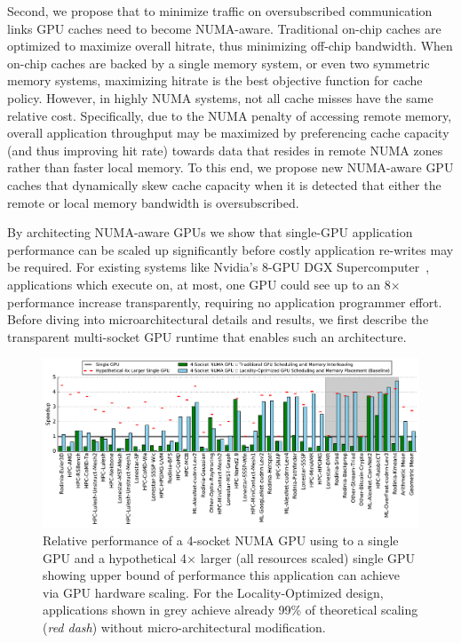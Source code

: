 Second, we propose that to minimize traffic on oversubscribed communication 
links GPU caches need to become NUMA-aware.  Traditional on-chip caches are 
optimized to maximize overall hitrate, thus minimizing off-chip bandwidth.  When 
on-chip caches are backed by a single memory system, or even two symmetric 
memory systems, maximizing hitrate is the best objective function for cache 
policy.  However, in highly NUMA systems,  not all cache misses have the same 
relative cost.  Specifically, due to the NUMA penalty of accessing remote 
memory, overall application throughput may be maximized by preferencing cache 
capacity (and thus improving hit rate) towards data that resides in remote NUMA 
zones rather than faster local memory. To this end, we propose new NUMA-aware 
GPU caches that dynamically skew cache capacity when it is detected that either 
the remote or local memory bandwidth is oversubscribed.

By architecting NUMA-aware GPUs we show that single-GPU application performance 
can be scaled up significantly before costly application re-writes may be 
required. For existing systems like Nvidia's 8-GPU DGX 
Supercomputer~\cite{dgx}, applications which execute on, at most, one GPU could 
see up to an 8$\times$ performance increase transparently, requiring no 
application programmer effort. Before diving into microarchitectural details and 
results, we first describe the transparent multi-socket GPU runtime that enables 
such an architecture.

\begin{figure}[tp] 
    \centering
    \includegraphics[width=1.0\linewidth]{figures/plot_different_baselines.pdf}
    \caption{Relative performance of a 4-socket NUMA GPU using to a single GPU 
and a hypothetical 4$\times$ larger (all resources scaled) single GPU showing 
upper bound of performance this application can achieve via GPU hardware 
scaling. For the Locality-Optimized design, applications shown in grey 
achieve already 99\% of theoretical scaling (\emph{red dash}) without 
micro-architectural modification.}
    \label{fig:motivation}
    \vspace{-.2in}
\end{figure}
